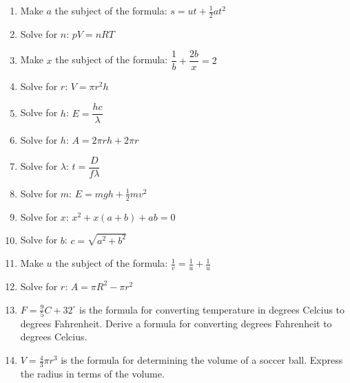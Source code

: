 \begin{exercises}{}
{
\begin{enumerate}[itemsep=4pt, label=\textbf{\arabic*}. ] 
\item Make $a$ the subject of the formula: $s=ut+\frac{1}{2}at^{2}$
\item Solve for $n$: $pV=nRT$ 
\item Make $x$ the subject of the formula: $\dfrac{1}{b}+\dfrac{2b}{x}=2$
\item Solve for $r$: $V = \pi r^{2} h$
\item Solve for $h$: $E=\dfrac{hc}{\lambda}$
\item Solve for $h$: $A=2\pi rh + 2 \pi r$
\item Solve for $\lambda$: $t=\dfrac{D}{f \lambda}$
\item Solve for $m$: $E=mgh + \frac{1}{2}mv^{2}$
\item Solve for $x$: $x^2+x(a+b)+ab=0$
\item Solve for $b$: $c=\sqrt{a^2+b^2}$
\item Make $u$ the subject of the formula: $\frac{1}{v}=\frac{1}{u}+\frac{1}{u}$
\item Solve for $r$: $A=\pi R^2 -\pi r^2$
\item $F=\frac{9}{5}C + 32^\circ$ is the formula for converting temperature in degrees Celcius to degrees Fahrenheit. Derive a formula for converting degrees Fahrenheit to degrees Celcius.
\item $V=\frac{4}{3}\pi r^3$ is the formula for determining the volume of a soccer ball. Express the radius in terms of the volume.
\end{enumerate}
}
\end{exercises}


